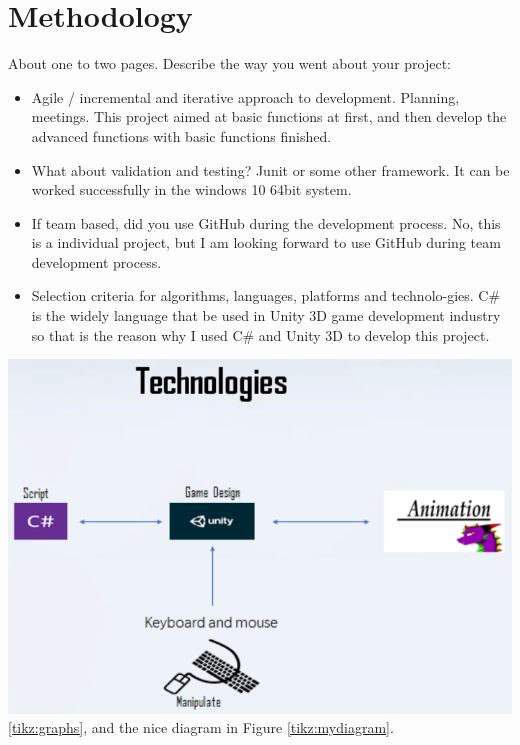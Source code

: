 \chapter{Methodology}
About one to two pages.
Describe the way you went about your project:
\begin{itemize}
\item Agile / incremental and iterative approach to development. Planning, meetings.
This project aimed at basic functions at first, and then develop the advanced functions with basic functions finished.
\item What about validation and testing? Junit or some other framework.
It can be worked successfully in the windows 10 64bit system. 
\item If team based, did you use GitHub during the development process.
No, this is a individual project, but I am looking forward to use GitHub during team development process.
\item Selection criteria for algorithms, languages, platforms and technolo-gies.
C\# is the widely language that be used in Unity 3D game development industry so that is the reason why I used C\# and Unity 3D to develop this project.
\end{itemize}
\includegraphics[scale=0.5]{img/MainGraph.png} \ref{tikz:graphs}, and the nice diagram in Figure \ref{tikz:mydiagram}.

